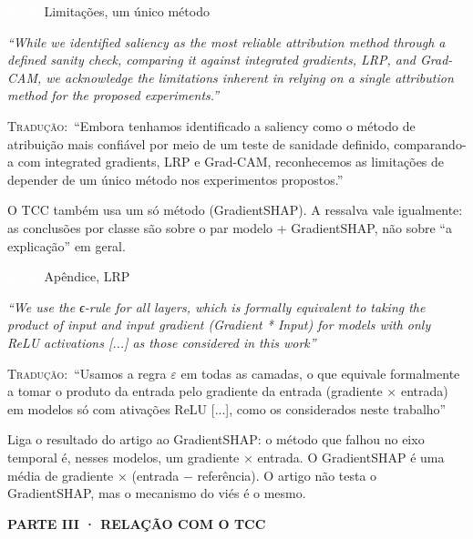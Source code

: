 \documentclass[11pt,a4paper]{article}
\newcommand{\pagechip}[1]{{\setlength{\fboxsep}{1.5pt}\colorbox{cAcc}{\textcolor{white}{\scriptsize\texttt{#1}}}}}
\newcommand{\partbar}[1]{\par\vspace{1.2em}\noindent\colorbox{black!80}{\parbox{\dimexpr\linewidth-2\fboxsep}{\color{white}\bfseries\sffamily\MakeUppercase{#1}}}\par\vspace{0.4em}}
\newenvironment{origquote}{\par\itshape\small}{\par}
\newenvironment{tradquote}{\par\small\textsc{Tradução:}\ }{\par}
\newcommand{\explab}[1]{\par\smallskip{\small\color{cAcc}\textbf{\MakeUppercase{#1}}}\par}
\begin{document}
\begin{citacard}{\pagechip{p. 15} Limitações, um único método}
\begin{origquote}“While we identified saliency as the most reliable attribution method through a defined sanity check, comparing it against integrated gradients, LRP, and Grad-CAM, we acknowledge the limitations inherent in relying on a single attribution method for the proposed experiments.”\end{origquote}
\begin{tradquote}“Embora tenhamos identificado a saliency como o método de atribuição mais confiável por meio de um teste de sanidade definido, comparando-a com integrated gradients, LRP e Grad-CAM, reconhecemos as limitações de depender de um único método nos experimentos propostos.”\end{tradquote}
\explab{Explicação}
O TCC também usa um só método (GradientSHAP). A ressalva vale igualmente: as conclusões por classe são sobre o par modelo + GradientSHAP, não sobre “a explicação” em geral.
\end{citacard}

\begin{citacard}{\pagechip{p. 22} Apêndice, LRP}
\begin{origquote}“We use the ϵ-rule for all layers, which is formally equivalent to taking the product of input and input gradient (Gradient * Input) for models with only ReLU activations [...] as those considered in this work”\end{origquote}
\begin{tradquote}“Usamos a regra $\varepsilon$ em todas as camadas, o que equivale formalmente a tomar o produto da entrada pelo gradiente da entrada (gradiente × entrada) em modelos só com ativações ReLU [...], como os considerados neste trabalho”\end{tradquote}
\explab{Explicação}
Liga o resultado do artigo ao GradientSHAP: o método que falhou no eixo temporal é, nesses modelos, um gradiente × entrada. O GradientSHAP é uma média de gradiente × (entrada $-$ referência). O artigo não testa o GradientSHAP, mas o mecanismo do viés é o mesmo.
\end{citacard}

\partbar{Parte III · Relação com o TCC}
\end{document}
